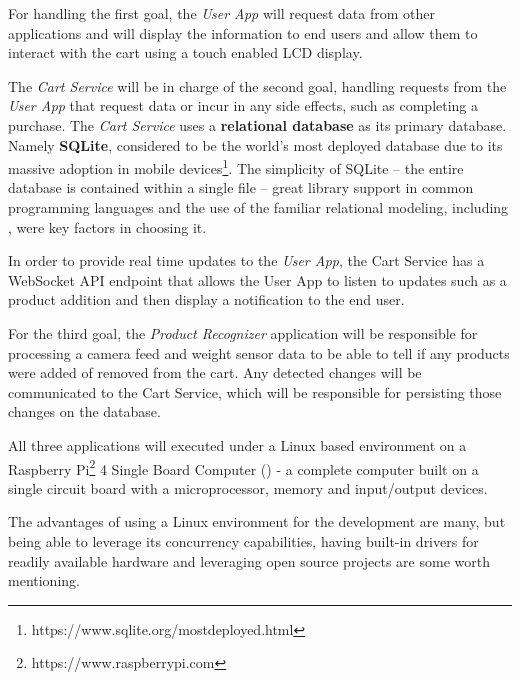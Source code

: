 \documentclass[openright]{normas-utf-tex} %
\begin{document}
For handling the first goal, the \textit{User App} will request data
from other applications and will display the information to end users and allow
them to interact with the cart using a touch enabled LCD display. 

The \textit{Cart Service} will be in charge of the second goal,
handling requests from the \textit{User App} that request data or incur in any
side effects, such as completing a purchase. The \textit{Cart Service} uses a
\textbf{relational database} \cite{Silberschatz2010} as its primary database. Namely
\textbf{SQLite}, considered to be the world's most deployed database due to its
massive adoption in mobile
devices\footnote{https://www.sqlite.org/mostdeployed.html}. The simplicity of
SQLite -- the entire database is contained within a single file -- great
library support in common programming languages and the use of the familiar
relational modeling, including 
\cite{Nield2016}, were key factors in choosing it.

In order to provide real time updates to the \textit{User App}, the Cart Service has a
WebSocket API endpoint that allows the User App to listen to updates such as a product addition
and then display a notification to the end user.

For the third goal, the \textit{Product Recognizer} application will be responsible
for processing a camera feed and weight sensor data to be able to tell if any products
were added of removed from the cart. Any detected changes will be communicated to the
Cart Service, which will be responsible for persisting those changes on the database. 

All three applications will executed under a Linux \cite{Tanenbaum2015} 
based environment on a Raspberry Pi\footnote{https://www.raspberrypi.com} 4 Single Board
Computer () - a complete computer built on a single 
circuit board with a microprocessor, memory and input/output devices.

The advantages of using a Linux environment for the development are many, but
being able to leverage its concurrency capabilities, having built-in drivers
for readily available hardware and leveraging open source projects are some 
worth mentioning.
\end{document}
